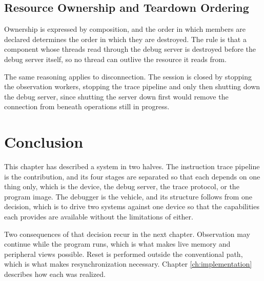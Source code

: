 \subsection{Resource Ownership and Teardown Ordering}
Ownership is expressed by composition, and the order in which members are declared determines the order in which they are destroyed. The rule is that a component whose threads read through the debug server is destroyed before the debug server itself, so no thread can outlive the resource it reads from.

The same reasoning applies to disconnection. The session is closed by stopping the observation workers, stopping the trace pipeline and only then shutting down the debug server, since shutting the server down first would remove the connection from beneath operations still in progress.

\section{Conclusion}
This chapter has described a system in two halves. The instruction trace pipeline is the contribution, and its four stages are separated so that each depends on one thing only, which is the device, the debug server, the trace protocol, or the program image. The debugger is the vehicle, and its structure follows from one decision, which is to drive two systems against one device so that the capabilities each provides are available without the limitations of either.

Two consequences of that decision recur in the next chapter. Observation may continue while the program runs, which is what makes live memory and peripheral views possible. Reset is performed outside the conventional path, which is what makes resynchronization necessary. Chapter \ref{ch:implementation} describes how each was realized.
